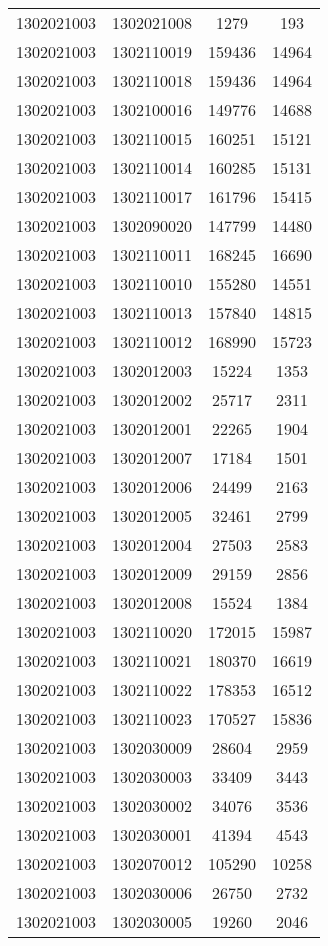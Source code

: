 \begin{longtable}{llcc}
1302021003 & 1302021008 & 1279 & 193\\
1302021003 & 1302110019 & 159436 & 14964\\
1302021003 & 1302110018 & 159436 & 14964\\
1302021003 & 1302100016 & 149776 & 14688\\
1302021003 & 1302110015 & 160251 & 15121\\
1302021003 & 1302110014 & 160285 & 15131\\
1302021003 & 1302110017 & 161796 & 15415\\
1302021003 & 1302090020 & 147799 & 14480\\
1302021003 & 1302110011 & 168245 & 16690\\
1302021003 & 1302110010 & 155280 & 14551\\
1302021003 & 1302110013 & 157840 & 14815\\
1302021003 & 1302110012 & 168990 & 15723\\
1302021003 & 1302012003 & 15224 & 1353\\
1302021003 & 1302012002 & 25717 & 2311\\
1302021003 & 1302012001 & 22265 & 1904\\
1302021003 & 1302012007 & 17184 & 1501\\
1302021003 & 1302012006 & 24499 & 2163\\
1302021003 & 1302012005 & 32461 & 2799\\
1302021003 & 1302012004 & 27503 & 2583\\
1302021003 & 1302012009 & 29159 & 2856\\
1302021003 & 1302012008 & 15524 & 1384\\
1302021003 & 1302110020 & 172015 & 15987\\
1302021003 & 1302110021 & 180370 & 16619\\
1302021003 & 1302110022 & 178353 & 16512\\
1302021003 & 1302110023 & 170527 & 15836\\
1302021003 & 1302030009 & 28604 & 2959\\
1302021003 & 1302030003 & 33409 & 3443\\
1302021003 & 1302030002 & 34076 & 3536\\
1302021003 & 1302030001 & 41394 & 4543\\
1302021003 & 1302070012 & 105290 & 10258\\
1302021003 & 1302030006 & 26750 & 2732\\
1302021003 & 1302030005 & 19260 & 2046\\

\end{longtable}
